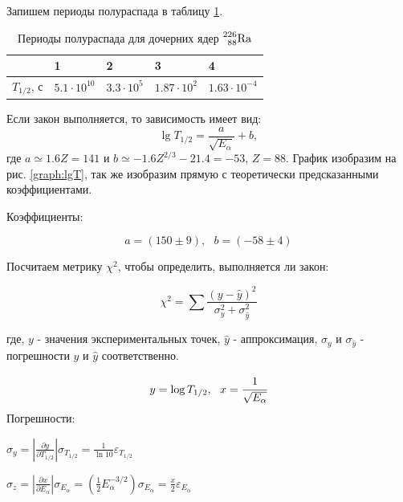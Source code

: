 \documentclass[a4paper,12pt]{article}
\begin{document}
Запишем периоды полураспада в таблицу \ref{table:4}.

\begin{table}[!ht]
    \centering
    \begin{tabular}{|l|l|l|l|l|}
        \hline
        ~              & 1   & 2   & 3   & 4   \\ \hline
        $T_{1/2}$, с   & $5.1 \cdot 10^{10}$ & $3.3\cdot 10^{5}$ & $1.87\cdot 10^{2}$ & $1.63 \cdot 10^{-4}$ \\ \hline
    \end{tabular}
    \caption{Периоды полураспада для дочерних ядер $\prescript{226}{88}{\text{Ra}}$}
    \label{table:4}
\end{table}


Если закон выполняется, то зависимость имеет вид:
\begin{equation*}
    \lg{T_{1/2}} = \frac{a}{\sqrt{E_\alpha}} + b,
\end{equation*}
где $a \simeq 1.6 Z = 141$ и $b \simeq -1.6 Z^{2/3} - 21.4 = -53$, $Z = 88$. График изобразим на рис. \ref{graph:lgT}, так же изобразим прямую с теоретически предсказанными коэффициентами.

Коэффициенты:

\begin{equation*}
    a = (150 \pm 9), \ \ \ b = (-58 \pm 4)
\end{equation*}

Посчитаем метрику $\chi^2$, чтобы определить, выполняется ли закон:

\begin{equation*}
    \chi^2 = \sum \frac{\left(y - \hat{y}\right)^2}{\sigma_y^2 + \sigma_{\hat{y}}^2}
\end{equation*}

где, $y$ - значения экспериментальных точек, $\hat{y}$ - аппроксимация, $\sigma_y$ и $\sigma_{\hat{y}}$ - погрешности $y$ и $\hat{y}$ соответственно.

\begin{equation*}
    y = \log{T_{1/2}}, \ \ x = \cfrac{1}{\sqrt{E_\alpha}}
\end{equation*}
Погрешности:

$ \sigma_y = \left| \frac{\partial y}{\partial T_{1/2}} \right| \sigma_{T_{1/2}} = \frac{1}{\ln{10}} \varepsilon_{T_{1/2}} $

$ \sigma_z = \left| \frac{\partial x}{\partial E_\alpha} \right| \sigma_{E_\alpha} = \left(  \frac{1}{2} E_\alpha^{-3/2} \right) \sigma_{E_\alpha} = \frac{x}{2} \varepsilon_{E_\alpha}$
\end{document}

